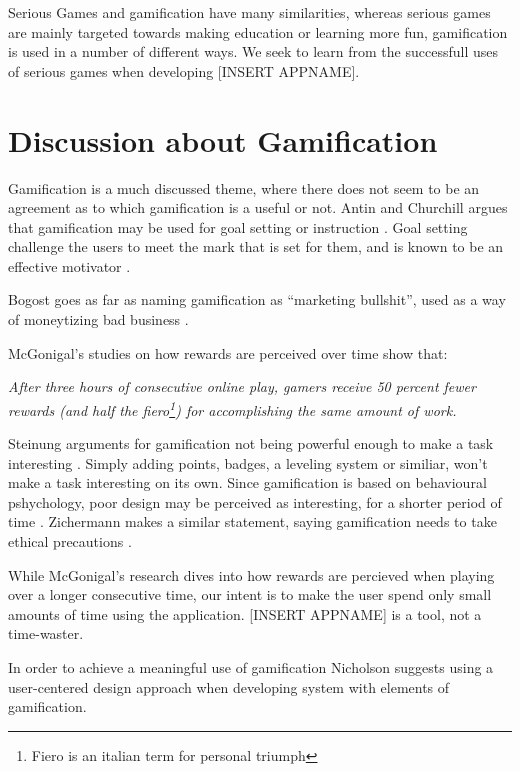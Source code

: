 Serious Games and gamification have many similarities, whereas serious games are mainly targeted towards making education or learning more fun, gamification is used in a number of different ways. We seek to learn from the successfull uses of serious games when developing [INSERT APPNAME].


\section{Discussion about Gamification}
\label{sec:gamificationdiscussion}

Gamification is a much discussed theme, where there does not seem to be an agreement as to which gamification is a useful or not. 
Antin and Churchill argues that gamification may be used for goal setting or instruction \cite{antin2011badges}. Goal setting challenge the users to meet the mark that is set for them, and is known to be an effective motivator \cite{ling2005using}. 

Bogost goes as far as naming gamification as ``marketing bullshit'', used as a way of moneytizing bad business \cite{gamificationbullshit}.

McGonigal's studies on how rewards are perceived over time show that: 

\textit{After three hours of consecutive online play, gamers receive 50 percent fewer rewards (and half the fiero\footnote{Fiero is an italian term for personal triumph\cite{ekman2007emotions}}) for accomplishing the same amount of work.} \cite{jane2011reality}

Steinung arguments for gamification not being powerful enough to make a task interesting \cite{steinung2012interessante}. Simply adding points, badges, a leveling system or similiar, won't make a task interesting on its own. Since gamification is based on behavioural pshychology, poor design may be perceived as interesting, for a shorter period of time \cite{steinung2012interessante}. Zichermann makes a similar statement, saying gamification needs to take ethical precautions \cite{zichermann2011gamification}.

While McGonigal's research dives into how rewards are percieved when playing over a longer consecutive time, our intent is to make the user spend only small amounts of time using the application. [INSERT APPNAME] is a tool, not a time-waster.

In order to achieve a meaningful use of gamification Nicholson\cite{nicholson2012user} suggests using a user-centered design approach\cite{usercentereddesign} when developing system with elements of gamification. 


